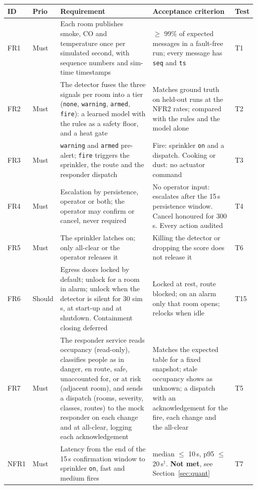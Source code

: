 \documentclass[11pt]{article}
\newcommand{\code}[1]{\texttt{#1}}
\begin{document}
{\setlength{\extrarowheight}{1pt}\begin{longtable}{@{}L{1.0cm}L{0.9cm}L{5.9cm}L{5.1cm}L{1.4cm}@{}}
\toprule
ID & Prio & Requirement & Acceptance criterion & Test\\
\midrule\endhead
FR1 & Must & Each room publishes smoke, CO and temperature once per simulated second, with sequence numbers and sim-time timestamps & $\ge$ 99\% of expected messages in a fault-free run; every message has \code{seq} and \code{ts} & T1\\
FR2 & Must & The detector fuses the three signals per room into a tier (\code{none}, \code{warning}, \code{armed}, \code{fire}): a learned model with the rules as a safety floor, and a heat gate & Matches ground truth on held-out runs at the NFR2 rates; compared with the rules and the model alone & T2\\
FR3 & Must & \code{warning} and \code{armed} pre-alert; \code{fire} triggers the sprinkler, the route and the responder dispatch & Fire: sprinkler \code{on} and a dispatch. Cooking or dust: no actuator command & T3\\
FR4 & Must & Escalation by persistence, operator or both; the operator may confirm or cancel, never required & No operator input: escalates after the 15\,s persistence window. Cancel honoured for 300\,s. Every action audited & T4\\
FR5 & Must & The sprinkler latches on; only all-clear or the operator releases it & Killing the detector or dropping the score does not release it & T6\\
FR6 & Should & Egress doors locked by default; unlock for a room in alarm; unlock when the detector is silent for 30 sim s, at start-up and at shutdown. Containment closing deferred & Locked at rest, route blocked; on an alarm only that room opens; relocks when idle & T15\\
FR7 & Must & The responder service reads occupancy (read-only), classifies people as in danger, en route, safe, unaccounted for, or at risk (adjacent room), and sends a dispatch (rooms, severity, classes, routes) to the mock responder on each change and at all-clear, logging each acknowledgement & Matches the expected table for a fixed snapshot; stale occupancy shows as unknown; a dispatch with an acknowledgement for the fire, each change and the all-clear & T5\\
NFR1 & Must & Latency from the end of the 15\,s confirmation window to sprinkler \code{on}, fast and medium fires & median $\le$ 10\,s, p95 $\le$ 20\,s$^\dagger$. \textbf{Not met}, see Section~\ref{sec:quant} & T7\\

\end{longtable}}
\end{document}
